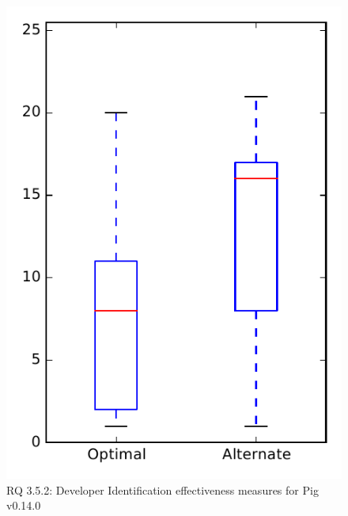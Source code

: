 
\begin{figure}
\centering
\includegraphics[height=0.4\textheight]{figures/combo/dit_rq2_pig}
\caption{RQ 3.5.2: Developer Identification effectiveness measures for Pig v0.14.0}
\label{fig:dit:rq2:pig}
\end{figure}
